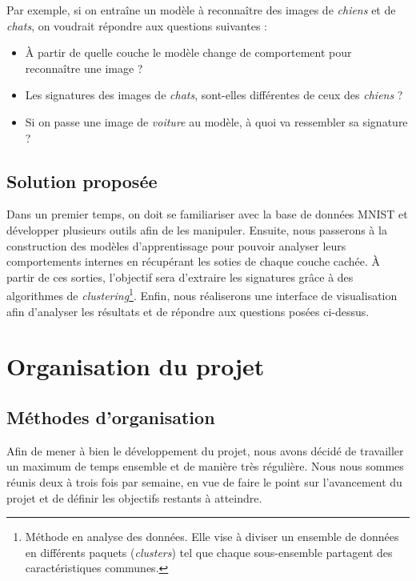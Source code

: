 \documentclass[oneside,13pt,a4paper]{report}
\begin{document}
Par exemple, si on entraîne un modèle à reconnaître des images de \textit{chiens} et de \textit{chats}, on voudrait répondre aux questions suivantes :

\begin{itemize}
	\item À partir de quelle couche le modèle change de comportement pour reconnaître une image ?
	\item Les signatures des images de \textit{chats}, sont-elles différentes de ceux des \textit{chiens} ?
	\item Si on passe une image de \textit{voiture} au modèle, à quoi va ressembler sa signature ?
\end{itemize}

\section{Solution proposée}

Dans un premier temps, on doit se familiariser avec la base de données MNIST et développer plusieurs outils afin de les manipuler. Ensuite, nous passerons à la construction des modèles d'apprentissage pour pouvoir analyser leurs comportements internes en récupérant les soties de chaque couche cachée. À partir de ces sorties, l'objectif sera d'extraire les signatures grâce à des algorithmes de \textit{clustering}\footnote{Méthode en analyse des données. Elle vise à diviser un ensemble de données en différents paquets (\textit{clusters}) tel que chaque sous-ensemble partagent des caractéristiques communes.}. Enfin, nous réaliserons une interface de visualisation afin d'analyser les résultats et de répondre aux questions posées ci-dessus.


\chapter{Organisation du projet}
\section{Méthodes d’organisation}

Afin de mener à bien le développement du projet, nous avons décidé de travailler un maximum de temps ensemble et de manière très régulière. Nous nous sommes réunis deux à trois fois par semaine, en vue de faire le point sur l'avancement du projet et de définir les objectifs restants à atteindre.
\end{document}
